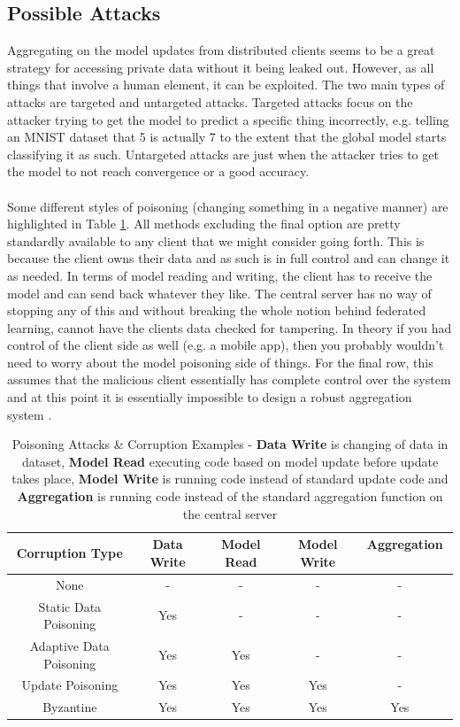 \subsection{Possible Attacks}
Aggregating on the model updates from distributed clients seems to be a great strategy for accessing private data without it being leaked out. 
However, as all things that involve a human element, it can be exploited. 
The two main types of attacks are targeted and untargeted attacks.
Targeted attacks focus on the attacker trying to get the model to predict a specific thing incorrectly, e.g. telling an MNIST dataset that 5 is actually 7 to the extent that the global model starts classifying it as such. 
Untargeted attacks are just when the attacker tries to get the model to not reach convergence or a good accuracy.
\\ \\
Some different styles of poisoning (changing something in a negative manner) are highlighted in Table \ref{tbl:poisoning}. 
All methods excluding the final option are pretty standardly available to any client that we might consider going forth. 
This is because the client owns their data and as such is in full control and can change it as needed. In terms of model reading and writing, the client has to receive the model and can send back whatever they like. The central server has no way of stopping any of this and without breaking the whole notion behind federated learning, cannot have the clients data checked for tampering. In theory if you had control of the client side as well (e.g. a mobile app), then you probably wouldn't need to worry about the model poisoning side of things. For the final row, this assumes that the malicious client essentially has complete control over the system and at this point it is essentially impossible to design a robust aggregation system \cite{robagg_fl}.
\begin{center}
    \begin{longtable}{ |c|c|c|c|c| }
    \caption{Poisoning Attacks \& Corruption Examples \cite{robagg_fl} - \textbf{Data Write} is changing of data in dataset, \textbf{Model Read} executing code based on model update before update takes place, \textbf{Model Write} is running code instead of standard update code and \textbf{Aggregation} is running code instead of the standard aggregation function on the central server}
    \label{tbl:poisoning}
    \hline
    \textbf{Corruption Type} & \textbf{Data Write} & \textbf{Model Read} & \textbf{Model Write} & \textbf{Aggregation} \ \\ \hline
    None & - & - & - & - \ \\ \hline
    Static Data Poisoning & Yes & - & - & - \ \\ \hline
    Adaptive Data Poisoning & Yes & Yes & - & - \ \\ \hline
    Update Poisoning & Yes & Yes & Yes & - \ \\ \hline
    Byzantine & Yes & Yes & Yes & Yes \ \\ \hline
    \end{longtable}
\end{center}
